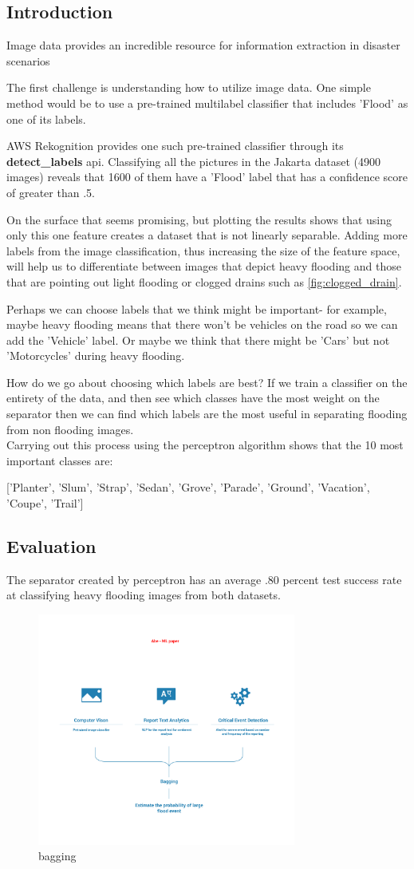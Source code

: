 \subsection{Introduction}
Image data provides an incredible resource for information extraction in disaster 
scenarios \cite{}



The first challenge is understanding how to utilize image data. One simple method would be to use 
a pre-trained multilabel classifier that includes 'Flood' as one of its labels. 

AWS Rekognition provides one such pre-trained classifier through its \textbf{detect\_labels} api. Classifying all the pictures in the Jakarta dataset (4900 images) 
reveals that 1600 of them have 
a 'Flood' label that has a confidence score of greater than .5. 

On the surface that seems promising, but plotting the results shows that using only 
this one feature creates a dataset that is not linearly separable. Adding more 
labels from the image classification, thus increasing the size of the feature space, 
will help us to differentiate between images that depict heavy flooding and those that 
are pointing out light flooding or clogged drains such as \ref{fig:clogged_drain}.

Perhaps we can choose labels that we think might be important- for example, 
maybe heavy flooding means that there won't be vehicles on the road so we can 
add the 'Vehicle' label. Or maybe we think that there might be 'Cars' but not 'Motorcycles' 
during heavy flooding. 

How do we go about choosing which labels are best?
If we train a classifier on the entirety of the data, and then see which classes have 
the most weight on the separator then we can find which labels are the most useful in 
separating flooding from non flooding images. 
\\
Carrying out this process using the perceptron algorithm shows that the 10 most important classes are: 

['Planter', 'Slum', 'Strap', 'Sedan', 'Grove', 'Parade', 'Ground', 'Vacation', 'Coupe', 'Trail']

\subsection{Evaluation}
The separator created by perceptron has an average .80 percent test success rate at classifying heavy 
flooding images from both datasets. 

\begin{figure}[ht]
    \includegraphics[width = 85mm]{ml_diagram.png}
    \caption{bagging}
    \label{fig:bagging}
\end{figure}